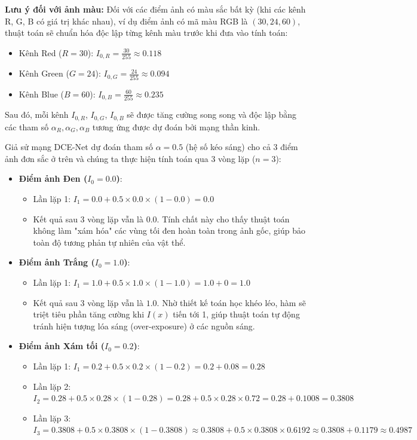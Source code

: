 \documentclass[a4paper]{article}
\begin{document}
\noindent \textbf{Lưu ý đối với ảnh màu:} Đối với các điểm ảnh có màu sắc bất kỳ (khi các kênh R, G, B có giá trị khác nhau), ví dụ điểm ảnh có mã màu RGB là $(30, 24, 60)$, thuật toán sẽ chuẩn hóa độc lập từng kênh màu trước khi đưa vào tính toán:
\begin{itemize}
    \item Kênh Red ($R=30$): $I_{0, R} = \frac{30}{255} \approx 0.118$
    \item Kênh Green ($G=24$): $I_{0, G} = \frac{24}{255} \approx 0.094$
    \item Kênh Blue ($B=60$): $I_{0, B} = \frac{60}{255} \approx 0.235$
\end{itemize}
Sau đó, mỗi kênh $I_{0, R}$, $I_{0, G}$, $I_{0, B}$ sẽ được tăng cường song song và độc lập bằng các tham số $\alpha_R, \alpha_G, \alpha_B$ tương ứng được dự đoán bởi mạng thần kinh.

Giả sử mạng DCE-Net dự đoán tham số $\alpha = 0.5$ (hệ số kéo sáng) cho cả 3 điểm ảnh đơn sắc ở trên và chúng ta thực hiện tính toán qua 3 vòng lặp ($n=3$):
\begin{itemize}
    \item \textbf{Điểm ảnh Đen ($I_0 = 0.0$)}: 
    \begin{itemize}
        \item Lần lặp 1: $I_1 = 0.0 + 0.5 \times 0.0 \times (1 - 0.0) = 0.0$
        \item Kết quả sau 3 vòng lặp vẫn là $0.0$. Tính chất này cho thấy thuật toán không làm "xám hóa" các vùng tối đen hoàn toàn trong ảnh gốc, giúp bảo toàn độ tương phản tự nhiên của vật thể.
    \end{itemize}
    
    \item \textbf{Điểm ảnh Trắng ($I_0 = 1.0$)}: 
    \begin{itemize}
        \item Lần lặp 1: $I_1 = 1.0 + 0.5 \times 1.0 \times (1 - 1.0) = 1.0 + 0 = 1.0$
        \item Kết quả sau 3 vòng lặp vẫn là $1.0$. Nhờ thiết kế toán học khéo léo, hàm sẽ triệt tiêu phần tăng cường khi $I(x)$ tiến tới 1, giúp thuật toán tự động tránh hiện tượng lóa sáng (over-exposure) ở các nguồn sáng.
    \end{itemize}
    
    \item \textbf{Điểm ảnh Xám tối ($I_0 = 0.2$)}: 
    \begin{itemize}
        \item Lần lặp 1: $I_1 = 0.2 + 0.5 \times 0.2 \times (1 - 0.2) = 0.2 + 0.08 = 0.28$
        \item Lần lặp 2: $I_2 = 0.28 + 0.5 \times 0.28 \times (1 - 0.28) = 0.28 + 0.5 \times 0.28 \times 0.72 = 0.28 + 0.1008 = 0.3808$
        \item Lần lặp 3: $I_3 = 0.3808 + 0.5 \times 0.3808 \times (1 - 0.3808) \approx 0.3808 + 0.5 \times 0.3808 \times 0.6192 \approx 0.3808 + 0.1179 \approx 0.4987$
    \end{itemize}
\end{itemize}
\end{document}
